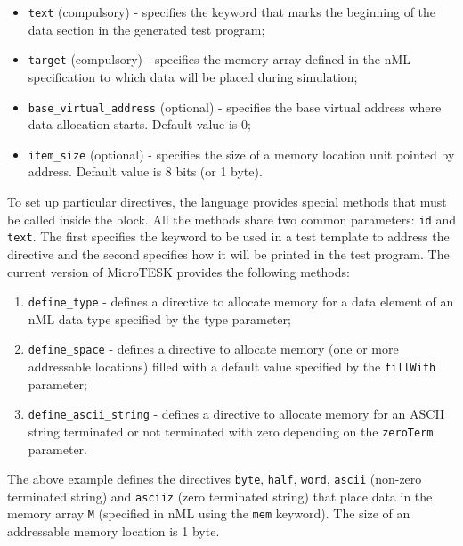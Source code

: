\documentclass[oneside,final,12pt]{extreport}
\begin{document}
\begin{itemize}
  \item \texttt{text} (compulsory) - specifies the keyword that marks the beginning of
        the data section in the generated test program;

  \item \texttt{target} (compulsory) - specifies the memory array defined in the nML
        specification to which data will be placed during simulation;

  \label{base_virtual_address}
  \item \texttt{base{\_}virtual{\_}address} (optional) - specifies the base virtual
        address where data allocation starts. Default value is 0;

  \item \texttt{item{\_}size} (optional) - specifies the size of a memory location unit
        pointed by address. Default value is 8 bits (or 1 byte).
\end{itemize}

To set up particular directives, the language provides special methods that must
be called inside the block. All the methods share two common parameters:
\texttt{id} and \texttt{text}. The first specifies the keyword to be used in a
test template to address the directive and the second specifies how it will be
printed in the test program. The current version of MicroTESK provides the following methods:

\begin{enumerate}
  \item \texttt{define{\_}type} - defines a directive to allocate memory for a data element
        of an nML data type specified by the type parameter;

  \label{define_space}
  \item \texttt{define{\_}space} - defines a directive to allocate memory (one or more
        addressable locations) filled with a default value specified by the
        \texttt{fillWith} parameter;

  \item \texttt{define{\_}ascii{\_}string} - defines a directive to allocate memory for an
        ASCII string terminated or not terminated with zero depending on the
        \texttt{zeroTerm} parameter.
\end{enumerate}

The above example defines the directives \texttt{byte}, \texttt{half}, \texttt{word},
\texttt{ascii} (non-zero terminated string) and \texttt{asciiz} (zero terminated string)
that place data in the memory array \texttt{M} (specified in nML using the \texttt{mem} keyword).
The size of an addressable memory location is 1 byte.
\end{document}
